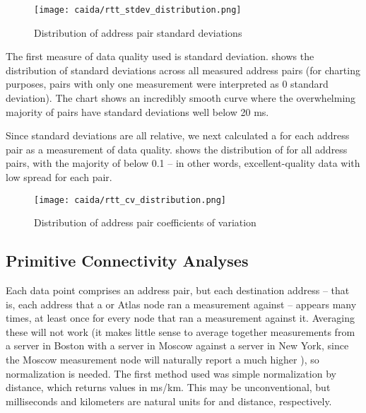 \begin{figure}[htb]
    \centering
    \texttt{[image: caida/rtt\_stdev\_distribution.png]}
    \caption{Distribution of address pair standard deviations}
    \label{fig:caida_stdev_distribution}
\end{figure}

The first measure of data quality used is standard deviation.  shows the distribution of standard deviations across all measured \ip address pairs (for charting purposes, pairs with only one measurement were interpreted as 0 standard deviation). The chart shows an incredibly smooth curve where the overwhelming majority of pairs have standard deviations well below 20 ms.

Since standard deviations are all relative, we next calculated a \cv for each \ip address pair as a measurement of data quality.  shows the distribution of \cvs for all \ip address pairs, with the majority of \cvs below 0.1 -- in other words, excellent-quality data with low spread for each pair.

\begin{figure}[htb]
    \centering
    \texttt{[image: caida/rtt\_cv\_distribution.png]}
    \caption{Distribution of address pair coefficients of variation}
    \label{fig:caida_cv_distribution}
\end{figure}

\subsection{Primitive Connectivity Analyses}

Each data point comprises an \ip address pair, but each destination \ip address -- that is, each \ip address that a \caida or \ripe Atlas node ran a measurement against -- appears many times, at least once for every node that ran a measurement against it. Averaging these will not work (it makes little sense to average together measurements from a server in Boston with a server in Moscow against a server in New York, since the Moscow measurement node will naturally report a much higher \rtt), so normalization is needed. The first method used was simple normalization by distance, which returns values in ms/km. This may be unconventional, but milliseconds and kilometers are natural units for \rtts and distance, respectively.

